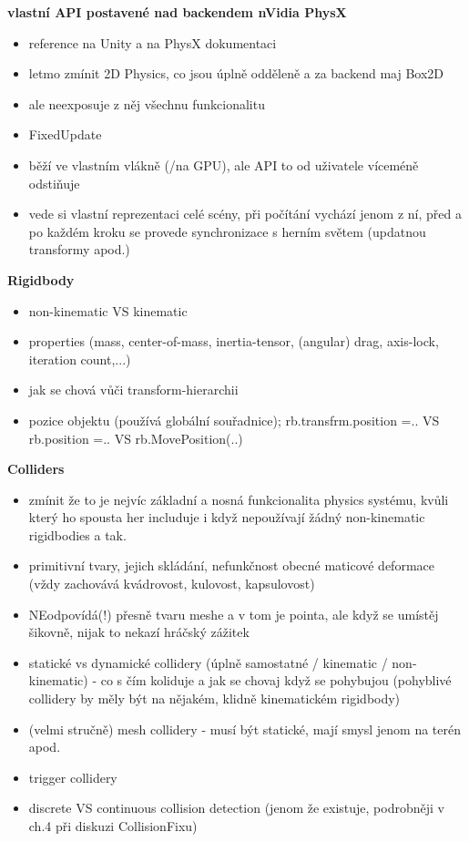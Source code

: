 \textbf{vlastní API postavené nad backendem nVidia PhysX}
\begin{itemize}
    \item reference na Unity a na PhysX dokumentaci
    \item letmo zmínit 2D Physics, co jsou úplně odděleně a za backend maj Box2D 
    \item ale neexposuje z něj všechnu funkcionalitu
    \item FixedUpdate
    \item běží ve vlastním vlákně (/na GPU), ale API to od uživatele víceméně odstiňuje
    \item vede si vlastní reprezentaci celé scény, při počítání vychází jenom z ní, před a po každém kroku se provede synchronizace s herním světem (updatnou transformy apod.)
\end{itemize}


\textbf{Rigidbody}
\begin{itemize}
    \item non-kinematic VS kinematic
    \item properties (mass, center-of-mass, inertia-tensor, (angular) drag, axis-lock, iteration count,...)
    \item jak se chová vůči transform-hierarchii
    \item pozice objektu (používá globální souřadnice); rb.transfrm.position =.. VS rb.position =.. VS rb.MovePosition(..)
\end{itemize}

\textbf{Colliders}
\begin{itemize}
    \item zmínit že to je nejvíc základní a nosná funkcionalita physics systému, kvůli který ho spousta her includuje i když nepoužívají žádný non-kinematic rigidbodies a tak.  
    \item primitivní tvary, jejich skládání, nefunkčnost obecné maticové deformace (vždy zachovává kvádrovost, kulovost, kapsulovost)
    \item NEodpovídá(!) přesně tvaru meshe a v tom je pointa, ale když se umístěj šikovně, nijak to nekazí hráčský zážitek
    \item statické vs dynamické collidery (úplně samostatné / kinematic / non-kinematic) - co s čím koliduje a jak se chovaj když se pohybujou (pohyblivé collidery by měly být na nějakém, klidně kinematickém rigidbody)
    \item (velmi stručně) mesh collidery - musí být statické, mají smysl jenom na terén apod.
    \item trigger collidery
    \item discrete VS continuous collision detection (jenom že existuje, podrobněji v ch.4 při diskuzi CollisionFixu)
\end{itemize}


